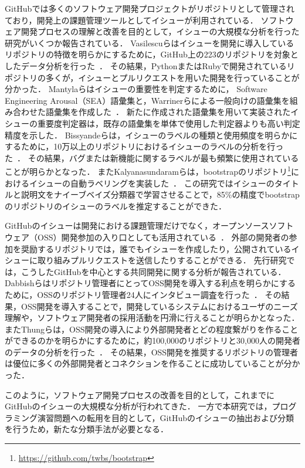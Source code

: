 GitHubでは多くのソフトウェア開発プロジェクトがリポジトリとして管理されており，開発上の課題管理ツールとしてイシューが利用されている．
ソフトウェア開発プロセスの理解と改善を目的として，イシューの大規模な分析を行った研究がいくつか報告されている．
Vasilescuらはイシューを開発に導入しているリポジトリの特徴を明らかにするために，GitHub上の223のリポジトリを対象としたデータ分析を行った~\cite{Continuous_Integration_in_a_Social_Coding_World}．
その結果，PythonまたはRubyで開発されているリポジトリの多くが，イシューとプルリクエストを用いた開発を行っていることが分かった．
Mantylaらはイシューの重要性を判定するために， Software Engineering Arousal（SEA）語彙集と，Warrinerらによる一般向けの語彙集を組み合わせた語彙集を作成した~\cite{Mantyla:issue:word:list}．
新たに作成された語彙集を用いて実装されたイシューの重要度判定器は，既存の語彙集を単体で使用した判定器よりも高い判定精度を示した．
Bissyandeらは，イシューのラベルの種類と使用頻度を明らかにするために，10万以上のリポジトリにおけるイシューのラベルの分析を行った~\cite{Bissyande:gh:issues}．
その結果，バグまたは新機能に関するラベルが最も頻繁に使用されていることが明らかとなった．
またKalyanasundaramらは，bootstrapのリポジトリ\footnote{\url{https://github.com/twbs/bootstrap}}におけるイシューの自動ラベリングを実装した~\cite{kalyanasundaram2014automatic}．
この研究ではイシューのタイトルと説明文をナイーブベイズ分類器で学習させることで，85\%の精度でbootstrapのリポジトリのイシューのラベルを推定することができた．

GitHubのイシューは開発における課題管理だけでなく，オープンソースソフトウェア（OSS）開発参加の入り口としても活用されている~\cite{github_analysis}．
外部の開発者の参加を奨励するリポジトリでは，誰でもイシューを作成したり，公開されているイシューに取り組みプルリクエストを送信したりすることができる．
先行研究では，こうしたGitHubを中心とする共同開発に関する分析が報告されている．
Dabbishらはリポジトリ管理者にとってOSS開発を導入する利点を明らかにするために，OSSのリポジトリ管理者24人にインタビュー調査を行った~\cite{Social_Coding_in_GitHub}．
その結果，OSS開発を導入することで，開発しているシステムにおけるユーザのニーズ理解や，ソフトウェア開発者の採用活動を円滑に行えることが明らかとなった．
またThungらは，OSS開発の導入により外部開発者とどの程度繋がりを作ることができるのかを明らかにするために，約100,000のリポジトリと30,000人の開発者のデータの分析を行った~\cite{Network_Structure_of_Social_Coding}．
その結果，OSS開発を推奨するリポジトリの管理者は優位に多くの外部開発者とコネクションを作ることに成功していることが分かった．

このように，ソフトウェア開発プロセスの改善を目的として，これまでにGitHubのイシューの大規模な分析が行われてきた．
一方で本研究では，プログラミング演習問題への転用を目的として，GitHubのイシューの抽出および分類を行うため，新たな分類手法が必要となる．



